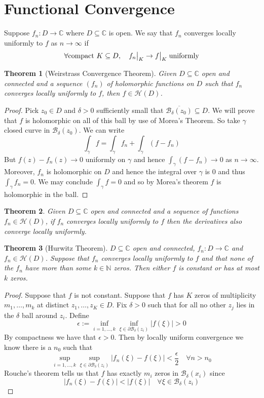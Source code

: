 \documentclass[11pt]{article}
\newcommand{\defeq}{:=}
\newcommand{\abs}[1]{\left|#1\right|}
\newcommand\restr[2]{{%
  \left.\kern-\nulldelimiterspace %
  #1 %
  \vphantom{\big|} %
  \right|_{#2} %
  }}
\newcommand{\C}{\mathbb{C}}
\newcommand{\N}{\mathbb{N}}
\newenvironment{defin}
	{\begin{mdframed}[backgroundcolor=white, roundcorner=5pt, linewidth=1pt]}
	{\end{mdframed}}
\newcommand{\mdf}[1]{{\color{red} #1}}
\newtheorem{theorem}{Theorem}[section]
\begin{document}
\section{Functional Convergence}
\begin{defin}
Suppose $f_n:D\to\C$ where $D\subseteq\C$ is open.
We say that $f_n$ \mdf{converges locally uniformly} to $f$ as $n\to\infty$ if
\[
	\forall\text{compact }K\subseteq D, \quad \restr{f_n}{K}\to\restr{f}{K}\;\text{uniformly}
\]
\end{defin}
\begin{theorem}[Weirstrass Convergence Theorem]
Given $D\subseteq\C$ open and connected and a sequence $(f_n)$ of holomorphic functions on $D$ such that $f_n$ converges locally uniformly to $f$, then $f\in\mathcal{H}(D)$.
\end{theorem}

\begin{proof}
Pick $z_0\in D$ and $\delta>0$ sufficiently small that $\overline{\mathcal{B}_\delta(z_0)}\subseteq D$.
We will prove that $f$ is holomorphic on all of this ball by use of Morea's Theorem.
So take $\gamma$ closed curve in $\mathcal{B}_\delta(z_0)$.
We can write
\[
	\int_\gamma f = \int_\gamma f_n + \int_\gamma (f - f_n)
\]
But $f(z)-f_n(z)\to 0$ uniformly on $\gamma$ and hence $\int_\gamma (f-f_n) \to 0$ as $n\to\infty$.
Moreover, $f_n$ is holomorphic on $D$ and hence the integral over $\gamma$ is $0$ and thus $\int_\gamma f_n=0$.
We may conclude $\int_\gamma f=0$ and so by Morea's theorem $f$ is holomorphic in the ball.
\end{proof}

\begin{theorem}
Given $D\subseteq\C$ open and connected and a sequence of functions $f_n\in\mathcal{H}(D)$, if $f_n$ converges locally uniformly to $f$ then the derivatives also converge locally uniformly.
\end{theorem}

\begin{theorem}[Hurwitz Theorem]
$D\subseteq\C$ open and connected, $f_n:D\to\C$ and $f_n\in\mathcal{H}(D)$.
Suppose that $f_n$ converges locally uniformly to $f$ and that none of the $f_n$ have more than some $k\in\N$ zeros.
Then either $f$ is constant or has at most $k$ zeros.
\end{theorem}

\begin{proof}
Suppose that $f$ is not constant.
Suppose that $f$ has $K$ zeros of multiplicity $m_1, \dots, m_k$ at distinct $z_1, \dots, z_K\in D$.
Fix $\delta >0$ such that for all no other $z_j$ lies in the $\delta$ ball around $z_i$.
Define
\[
	\epsilon\defeq\inf_{i=1, \dots, k}\inf_{\xi\in\partial\mathcal{B}_\delta(z_i)}\abs{f(\xi)} >0
\]
By compactness we have that $\epsilon >0$.
Then by locally uniform convergence we know there is a $n_0$ such that
\[
	\sup_{i=1, \dots, k}\sup_{\xi\in\partial\mathcal{B}_\delta(z_i)}\abs{f_n(\xi)-f(\xi)} < \frac{\epsilon}{2}\quad\forall n> n_0
\]
Rouche's theorem tells us that $f$ has exactly $m_i$ zeros in $\mathcal{B}_\delta(x_i)$ since
\[
	\abs{f_n(\xi)-f(\xi)} < \abs{f(\xi)} \quad \forall\xi\in\mathcal{B}_\delta(z_i)
\]
\end{proof}
\end{document}
